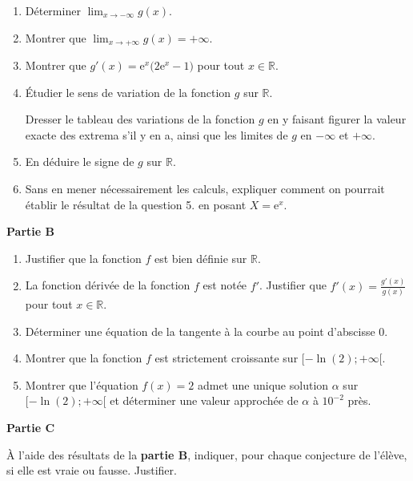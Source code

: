 \begin{enumerate}
	\item Déterminer $\displaystyle\lim_{x \to -\infty} g(x)$.
	\item Montrer que $\displaystyle\lim_{x \to +\infty} g(x) = +\infty$.
	\item Montrer que $g'(x)=\text{e}^x \big(2\text{e}^x-1\big)$ pour tout $x \in \mathbb{R}$.
	\item Étudier le sens de variation de la fonction $g$ sur $\mathbb{R}$.
	
	Dresser le tableau des variations de la fonction $g$ en y faisant figurer la valeur exacte des extrema s'il y en a, ainsi que les limites de $g$ en $-\infty$ et $+\infty$.
	\item En déduire le signe de $g$ sur $\mathbb{R}$.
	\item Sans en mener nécessairement les calculs, expliquer comment on pourrait établir le résultat de la question {5.} en posant $X = \text{e}^x$.
\end{enumerate}

\medskip

\textbf{Partie B}

\smallskip

\begin{enumerate}
	\item Justifier que la fonction $f$ est bien définie sur $\mathbb{R}$.
	\item La fonction dérivée de la fonction $f$ est notée $f'$. Justifier que $f'(x) = \frac{g'(x)}{g(x)}$ pour tout $x \in \mathbb{R}$.
	\item Déterminer une équation de la tangente à la courbe au point d'abscisse $0$.
	\item Montrer que la fonction $f$ est strictement croissante sur $[-\ln(2);+\infty[$.
	\item Montrer que l'équation $f(x) = 2$ admet une unique solution $\alpha$ sur $[-\ln(2);+\infty[$ et déterminer une valeur approchée de $\alpha$ à $10^{-2}$ près. 
\end{enumerate}

\medskip

\textbf{Partie C}

\medskip

À l'aide des résultats de la \textbf{partie B}, indiquer, pour chaque conjecture de l'élève, si elle est vraie ou fausse. Justifier. 
